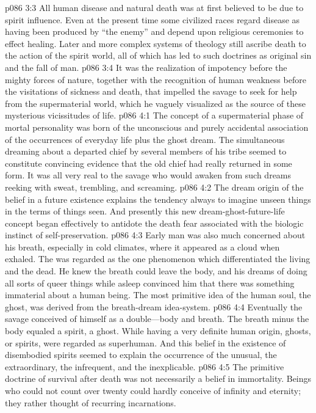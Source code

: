 \vs p086 3:3 All human disease and natural death was at first believed to be due to spirit influence. Even at the present time some civilized races regard disease as having been produced by “the enemy” and depend upon religious ceremonies to effect healing. Later and more complex systems of theology still ascribe death to the action of the spirit world, all of which has led to such doctrines as original sin and the fall of man.
\vs p086 3:4 It was the realization of impotency before the mighty forces of nature, together with the recognition of human weakness before the visitations of sickness and death, that impelled the savage to seek for help from the supermaterial world, which he vaguely visualized as the source of these mysterious vicissitudes of life.
\vs p086 4:1 The concept of a supermaterial phase of mortal personality was born of the unconscious and purely accidental association of the occurrences of everyday life plus the ghost dream. The simultaneous dreaming about a departed chief by several members of his tribe seemed to constitute convincing evidence that the old chief had really returned in some form. It was all very real to the savage who would awaken from such dreams reeking with sweat, trembling, and screaming.
\vs p086 4:2 The dream origin of the belief in a future existence explains the tendency always to imagine unseen things in the terms of things seen. And presently this new dream\hyp{}ghost\hyp{}future\hyp{}life concept began effectively to antidote the death fear associated with the biologic instinct of self\hyp{}preservation.
\vs p086 4:3 Early man was also much concerned about his breath, especially in cold climates, where it appeared as a cloud when exhaled. The  was regarded as the one phenomenon which differentiated the living and the dead. He knew the breath could leave the body, and his dreams of doing all sorts of queer things while asleep convinced him that there was something immaterial about a human being. The most primitive idea of the human soul, the ghost, was derived from the breath\hyp{}dream idea\hyp{}system.
\vs p086 4:4 Eventually the savage conceived of himself as a double---body and breath. The breath minus the body equaled a spirit, a ghost. While having a very definite human origin, ghosts, or spirits, were regarded as superhuman. And this belief in the existence of disembodied spirits seemed to explain the occurrence of the unusual, the extraordinary, the infrequent, and the inexplicable.
\pc \vs p086 4:5 The primitive doctrine of survival after death was not necessarily a belief in immortality. Beings who could not count over twenty could hardly conceive of infinity and eternity; they rather thought of recurring incarnations.

